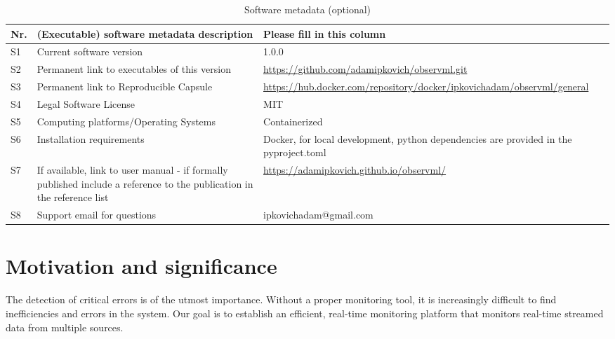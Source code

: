 \documentclass[preprint,12pt, a4paper]{elsarticle}
\begin{document}
\begin{table}[!h]
\begin{tabular}{|l|p{6.5cm}|p{6.5cm}|}
\hline
\textbf{Nr.} & \textbf{(Executable) software metadata description} & \textbf{Please fill in this column} \\
\hline
S1 & Current software version & 1.0.0 \\
\hline
S2 & Permanent link to executables of this version  & \url{https://github.com/adamipkovich/observml.git} \\
\hline
S3  & Permanent link to Reproducible Capsule & \url{https://hub.docker.com/repository/docker/ipkovichadam/observml/general} \\
\hline
S4 & Legal Software License & MIT \\
\hline
S5 & Computing platforms/Operating Systems & Containerized \\
\hline
S6 & Installation requirements & Docker, for local development, python dependencies are provided in the pyproject.toml  \\
\hline
S7 & If available, link to user manual - if formally published include a reference to the publication in the reference list &  \url{https://adamipkovich.github.io/observml/} \\
\hline
S8 & Support email for questions & ipkovichadam@gmail.com\\
\hline
\end{tabular}
\caption{Software metadata (optional)}
\label{executabelMetadata} 
\end{table}


\clearpage



\section{Motivation and significance}


The detection of critical errors is of the utmost importance. Without a proper monitoring tool, it is increasingly difficult to find inefficiencies and errors in the system. Our goal is to establish an efficient, real-time monitoring platform that monitors real-time streamed data from multiple sources.
\end{document}
